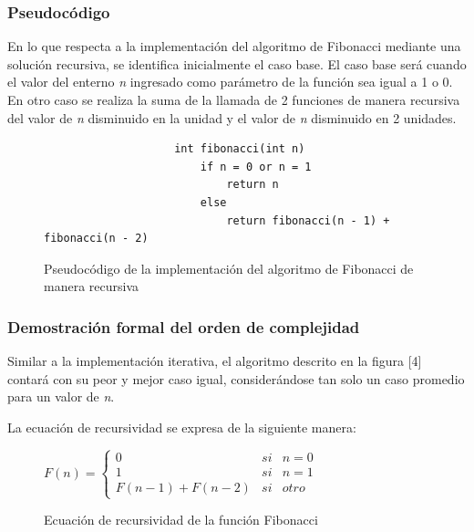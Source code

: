 \documentclass{report}
\begin{document}
        \subsubsection*{Pseudocódigo}
            En lo que respecta a la implementación del algoritmo de Fibonacci mediante una solución recursiva, se identifica inicialmente el caso base. El caso base será cuando el valor del enterno \textit{n} ingresado como parámetro de la función sea igual a 1 o 0. En otro caso se realiza la suma de la llamada de 2 funciones de manera recursiva del valor de \textit{n} disminuido en la unidad y el valor de \textit{n} disminuido en 2 unidades.
            \begin{figure}[!h]
                \begin{verbatim}
                    int fibonacci(int n)
                        if n = 0 or n = 1
                            return n
                        else
                            return fibonacci(n - 1) + fibonacci(n - 2)
                \end{verbatim}
                \caption{Pseudocódigo de la implementación del algoritmo de Fibonacci de manera recursiva}
                \label{fig:my_label}
            \end{figure}
            
        \subsubsection*{Demostración formal del orden de complejidad}
            Similar a la implementación iterativa, el algoritmo descrito en la figura [4] contará con su peor y mejor caso igual, considerándose tan solo un caso promedio para un valor de \textit{n}.
            
            \newpage
            
            La ecuación de recursividad se expresa de la siguiente manera:
            \begin{figure}[!h]
                \begin{center}
                    $F(n) = 
                    \left\{
                        \begin{array}{lcc}
                            0 & si & n = 0 \\
                            1 & si & n = 1 \\
                            F(n-1) + F(n-2) & si & otro
                        \end{array}
                    \right.$
                \end{center}
                \caption{Ecuación de recursividad de la función Fibonacci}
                \label{fig:my_label}
            \end{figure}
            
\end{document}
